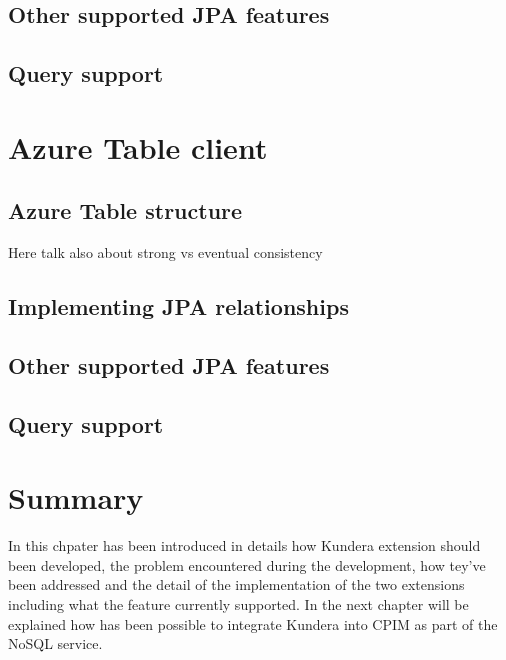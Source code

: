 \subsection{Other supported JPA features}


\subsection{Query support}


\section{Azure Table client}
\label{sec:kundera-table}

\subsection{Azure Table structure}
Here talk also about strong vs eventual consistency

\subsection{Implementing JPA relationships}


\subsection{Other supported JPA features}


\subsection{Query support}


\section{Summary}
In this chpater has been introduced in details how Kundera extension should been developed, the problem encountered during the development, how tey've been addressed and the detail of the implementation of the two extensions including what the feature currently supported.
In the next chapter will be explained how has been possible to integrate Kundera into CPIM as part of the NoSQL service.